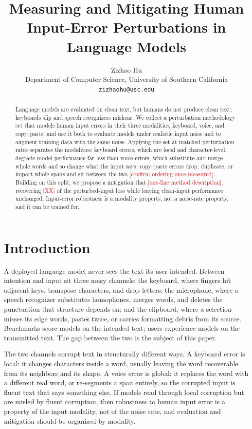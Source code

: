 \documentclass[11pt]{article}
\title{Measuring and Mitigating Human Input-Error Perturbations in Language Models}
\author{Zizhao Hu \\
  Department of Computer Science, University of Southern California \\
  \texttt{zizhaohu@usc.edu}}
\newcommand{\todo}[1]{\textcolor{red}{[#1]}}
\begin{document}
\maketitle

\begin{abstract}
Language models are evaluated on clean text, but humans do not produce clean text: keyboards slip
and speech recognizers mishear. We collect a perturbation methodology set that models human input
errors in their three modalities, keyboard, voice, and copy--paste, and use it both to evaluate
models under realistic input noise and to augment training data with the same noise. Applying the
set at matched perturbation rates separates the modalities: keyboard errors, which are local and
character-level, degrade model performance far less than voice errors, which substitute and merge
whole words and so change what the input says; copy--paste errors drop, duplicate, or import whole
spans and sit between the two \todo{confirm ordering once measured}. Building on this split, we propose a mitigation
that \todo{one-line method description}, recovering \todo{XX} of the perturbed-input loss while
leaving clean-input performance unchanged. Input-error robustness is a modality property, not a
noise-rate property, and it can be trained for.
\end{abstract}

\section{Introduction}
A deployed language model never sees the text its user intended. Between intention and input sit
three noisy channels: the keyboard, where fingers hit adjacent keys, transpose characters, and
drop letters; the microphone, where a speech recognizer substitutes homophones, merges words, and
deletes the punctuation that structure depends on; and the clipboard, where a selection misses its
edge words, pastes twice, or carries formatting debris from its source. Benchmarks score models on the intended text;
users experience models on the transmitted text. The gap between the two is the subject of this
paper.

The two channels corrupt text in structurally different ways. A keyboard error is local: it
changes characters inside a word, usually leaving the word recoverable from its neighbors and its
shape. A voice error is global: it replaces the word with a different real word, or re-segments a
span entirely, so the corrupted input is fluent text that says something else. If models read
through local corruption but are misled by fluent corruption, then robustness to human input error
is a property of the input modality, not of the noise rate, and evaluation and mitigation should
be organized by modality.
\end{document}
